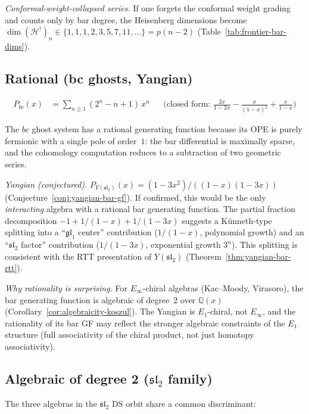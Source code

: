 \emph{Conformal-weight-collapsed series.}  If one forgets the conformal weight grading and counts only by bar degree, the Heisenberg dimensions become $\dim(\mathcal{H}^!)_n \in \{1, 1, 1, 2, 3, 5, 7, 11, \ldots\} = p(n-2)$ (Table~\ref{tab:frontier-bar-dims}).

\subsection{Rational (bc ghosts, Yangian)}
\label{subsec:gf-rational}

\begin{align}
P_{bc}(x) &= \sum_{n \geq 1}(2^n - n + 1)\,x^n
&&\text{(closed form: $\frac{2x}{1-2x} - \frac{x}{(1-x)^2} + \frac{x}{1-x}$)}
\label{eq:bc-gf}
\end{align}

The $bc$ ghost system has a rational generating function because its OPE is purely fermionic with a single pole of order~$1$: the bar differential is maximally sparse, and the cohomology computation reduces to a subtraction of two geometric series.

\emph{Yangian (conjectured).}
$P_{Y(\mathfrak{sl}_2)}(x) = (1-3x^2)/((1-x)(1-3x))$ (Conjecture~\ref{conj:yangian-bar-gf}).  If confirmed, this would be the only \emph{interacting} algebra with a rational bar generating function.  The partial fraction decomposition $-1 + 1/(1-x) + 1/(1-3x)$ suggests a K\"unneth-type splitting into a ``$\mathfrak{gl}_1$ center'' contribution ($1/(1-x)$, polynomial growth) and an ``$\mathfrak{sl}_2$ factor'' contribution ($1/(1-3x)$, exponential growth $3^n$).  This splitting is consistent with the RTT presentation of $Y(\mathfrak{sl}_2)$ (Theorem~\ref{thm:yangian-bar-rtt}).

\emph{Why rationality is surprising.}
For $E_\infty$-chiral algebras (Kac--Moody, Virasoro), the bar generating function is algebraic of degree~$2$ over $\mathbb{Q}(x)$ (Corollary~\ref{cor:algebraicity-koszul}).  The Yangian is $E_1$-chiral, not $E_\infty$, and the rationality of its bar GF may reflect the stronger algebraic constraints of the $E_1$ structure (full associativity of the chiral product, not just homotopy associativity).

\subsection{Algebraic of degree 2 ($\mathfrak{sl}_2$ family)}
\label{subsec:gf-algebraic}

The three algebras in the $\mathfrak{sl}_2$ DS orbit share a common discriminant:

